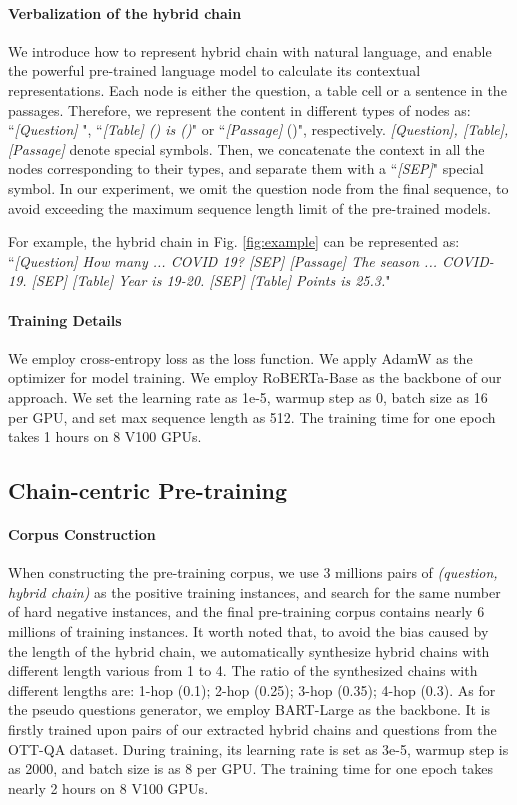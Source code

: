 \documentclass[11pt]{article}
\begin{document}
\paragraph{Verbalization of the hybrid chain}
We introduce how to represent hybrid chain with natural language, and enable the powerful pre-trained language model to calculate its contextual representations.
Each node is either the question, a table cell or a sentence in the passages. Therefore, we represent the content in different types of nodes as: ``\textit{[Question] }", 
``\textit{[Table] () is ()}" or ``\textit{[Passage]} ()", respectively. 
\textit{[Question], [Table], [Passage]} denote special symbols. 
Then, we concatenate the context in all the nodes corresponding to their types, and separate them with a ``\textit{[SEP]}" special symbol. In our experiment, we omit the question node from the final sequence, to avoid exceeding the maximum sequence length limit of the pre-trained models.

For example, the hybrid chain in Fig. \ref{fig:example} can be represented as:
``\textit{[Question] How many ... COVID 19? [SEP] [Passage] The season ... COVID-19. [SEP] [Table] Year is 19-20. [SEP] [Table] Points is 25.3.}"
 
\paragraph{Training Details}
We employ cross-entropy loss as the
loss function. We apply AdamW as the optimizer
for model training. We employ RoBERTa-Base as
the backbone of our approach. We set the learning rate as 1e-5, warmup
step as 0, batch size as 16 per GPU, and set max sequence
length as 512. The training time for one
epoch takes 1 hours on 8 V100 GPUs.

\subsection{Chain-centric Pre-training}

\paragraph{Corpus Construction}

When constructing the pre-training corpus, we use 3 millions pairs of \textit{(question, hybrid chain)} as the positive training instances, and search for the same number of hard negative instances, and the final pre-training corpus contains nearly 6 millions of training instances. 
It worth noted that, to avoid the bias caused by the length of the hybrid chain, we automatically synthesize hybrid chains with different length various from 1 to 4. 
The ratio of the synthesized chains with different lengths are: 1-hop (0.1); 2-hop (0.25); 3-hop (0.35); 4-hop (0.3). 
As for the pseudo questions generator, we employ BART-Large as the backbone.
It is firstly trained upon pairs of our extracted hybrid chains and questions from the OTT-QA dataset.
During training, its learning rate is set as 3e-5, warmup step is as 2000, and batch size is as 8 per GPU.
The training time for one epoch takes nearly 2 hours on 8 V100 GPUs.
\end{document}
